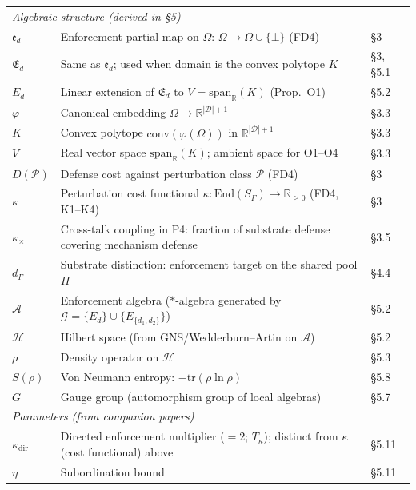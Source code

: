 \documentclass[11pt]{article}
\theoremstyle{remark}
\begin{document}
\begin{center}
\begin{tabular}{lp{8.5cm}l}
\multicolumn{3}{l}{\textit{Algebraic structure (derived in \S5)}} \\[2pt]
$\mathfrak{e}_d$ & Enforcement partial map on $\Omega$: $\Omega \to \Omega \cup \{\bot\}$ (FD4) & \S3 \\
$\mathfrak{E}_d$ & Same as $\mathfrak{e}_d$; used when domain is the convex polytope $K$ & \S3, \S5.1 \\
$E_d$ & Linear extension of $\mathfrak{E}_d$ to $V = \mathrm{span}_\mathbb{R}(K)$ (Prop.\ O1) & \S5.2 \\
$\varphi$ & Canonical embedding $\Omega \to \mathbb{R}^{|\mathcal{D}|+1}$ & \S3.3 \\
$K$ & Convex polytope $\mathrm{conv}(\varphi(\Omega))$ in $\mathbb{R}^{|\mathcal{D}|+1}$ & \S3.3 \\
$V$ & Real vector space $\mathrm{span}_\mathbb{R}(K)$; ambient space for O1--O4 & \S3.3 \\
$D(\mathcal{P})$ & Defense cost against perturbation class $\mathcal{P}$ (FD4) & \S3 \\
$\kappa$ & Perturbation cost functional $\kappa: \mathrm{End}(S_\Gamma) \to \mathbb{R}_{\ge 0}$ (FD4, K1--K4) & \S3 \\
$\kappa_\times$ & Cross-talk coupling in P4: fraction of substrate defense covering mechanism defense & \S3.5 \\
$d_\Gamma$ & Substrate distinction: enforcement target on the shared pool $\Pi$ & \S4.4 \\
$\mathcal{A}$ & Enforcement algebra ($*$-algebra generated by $\mathcal{G} = \{E_d\} \cup \{E_{\{d_1,d_2\}}\}$) & \S5.2 \\
$\mathcal{H}$ & Hilbert space (from GNS/Wedderburn--Artin on $\mathcal{A}$) & \S5.2 \\
$\rho$ & Density operator on $\mathcal{H}$ & \S5.3 \\
$S(\rho)$ & Von Neumann entropy: $-\mathrm{tr}(\rho \ln \rho)$ & \S5.8 \\
$G$ & Gauge group (automorphism group of local algebras) & \S5.7 \\[4pt]
\multicolumn{3}{l}{\textit{Parameters (from companion papers)}} \\[2pt]
$\kappa_{\mathrm{dir}}$ & Directed enforcement multiplier ($= 2$; $T_\kappa$); distinct from $\kappa$ (cost functional) above & \S5.11 \\
$\eta$ & Subordination bound & \S5.11 \\
\bottomrule
\end{tabular}
\label{tab:symbols}
\end{center}
\end{document}
